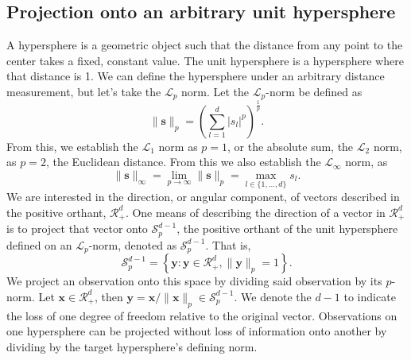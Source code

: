 \subsection{Projection onto an arbitrary unit hypersphere}
A hypersphere is a geometric object such that the distance from any point to the center takes a fixed,
  constant value.  The unit hypersphere is a hypersphere where that distance is 1. We can define the
  hypersphere under an arbitrary distance measurement, but let's take the $\mathcal{L}_p$ norm. Let
  the $\mathcal{L}_p$-norm be defined as
  \begin{equation*}
    \lVert \bm{s} \rVert_p = \left(\sum_{l = 1}^d \lvert s_l\rvert^p\right)^{\frac{1}{p}}.
  \end{equation*}
  From this, we establish the $\mathcal{L}_1$ norm as $p = 1$, or the absolute sum, the
  $\mathcal{L}_2$ norm, as $p = 2$, the Euclidean distance.  From this we also establish the
  $\mathcal{L}_{\infty}$ norm, as
  \begin{equation*}
    \lVert \bm{s} \rVert_{\infty}
      = \lim\limits_{p\to\infty} \lVert \bm{s} \rVert_p
      = \max_{l\in\lbrace1,\ldots,d\rbrace}s_l.
  \end{equation*}
  We are interested in the direction, or angular component, of vectors described in the positive
  orthant, $\mathcal{R}_{+}^d$.  One means of describing the direction of a vector in
  $\mathcal{R}_+^d$ is to project that vector onto $\mathcal{S}_{p}^{d-1}$, the positive orthant of
  the unit hypersphere defined on an $\mathcal{L}_p$-norm, denoted as $\mathcal{S}_{p}^{d-1}$.  That is,
  \begin{equation*}
    \mathcal{S}_{p}^{d-1} = \left\lbrace \bm{y} : \bm{y} \in \mathcal{R}_{+}^{d}, \lVert \bm{y}\rVert_{p} = 1\right\rbrace.
  \end{equation*}
  We project an observation onto this space by dividing said observation by its $p$-norm. Let
  $\bm{x}\in \mathcal{R}_{+}^{d}$, then $\bm{y} = \bm{x} / \lVert \bm{x}\rVert_p \in \mathcal{S}_{p}^{d-1}$.
  We denote the $d-1$ to indicate the loss of one degree of freedom relative to the original vector.
  Observations on one hypersphere can be projected without loss of information onto another by
  dividing by the target hypersphere's defining norm.

